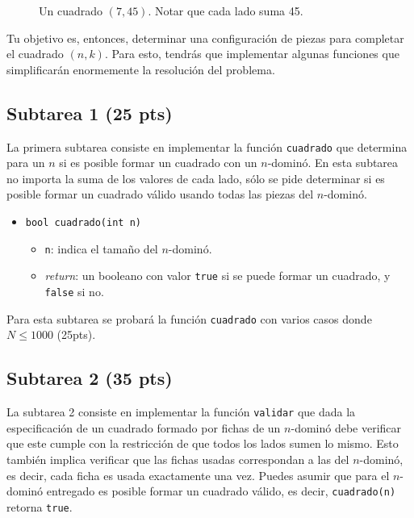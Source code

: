 \documentclass{oci}
\begin{document}
\begin{figure}[ht]
 \centering
 
 \caption{Un cuadrado $(7,45)$. Notar que cada lado suma 45.}
 \label{f:cuadrado7}
\end{figure}

Tu objetivo es, entonces, determinar una configuración de piezas para completar el cuadrado $(n,k)$.
Para esto, tendrás que implementar algunas funciones que simplificarán enormemente la resolución del problema.



\subsection*{Subtarea 1 (25 pts)}
La primera subtarea consiste en implementar la función \verb+cuadrado+ que determina para un $n$ si es posible formar un cuadrado con un $n$-dominó.
En esta subtarea no importa la suma de los valores de cada lado, sólo se pide determinar si es posible formar un cuadrado válido usando todas las piezas del $n$-dominó.

\begin{itemize}
 \item \verb+bool cuadrado(int n)+
 \begin{itemize}
  \item \verb+n+: indica el tamaño del $n$-dominó.
  \item \emph{return}: un booleano con valor \verb+true+ si se puede formar un cuadrado, y \verb+false+ si no.
 \end{itemize}
\end{itemize}

Para esta subtarea se probará la función \verb+cuadrado+ con varios casos donde $N\leq 1000$ (25pts).

\subsection*{Subtarea 2 (35 pts)}
La subtarea 2 consiste en implementar la función \verb+validar+ que dada la especificación de un cuadrado formado por fichas de un $n$-dominó debe verificar que este cumple con la restricción de que todos los lados sumen lo mismo.
Esto también implica verificar que las fichas usadas correspondan a las del $n$-dominó, es decir, cada ficha es usada exactamente una vez.
Puedes asumir que para el $n$-dominó entregado es posible formar un cuadrado válido, es decir, \verb+cuadrado(n)+ retorna \verb+true+.
\end{document}
